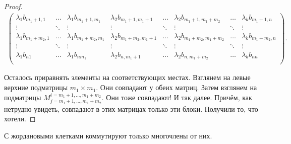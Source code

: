 \begin{proof}
\begin{multline*}
\begin{pmatrix}
            \lambda_1b_{m_1 + 1, 1} & \ldots & \lambda_1b_{m_1 + 1, m_1} & \lambda_2b_{m_1 + 1, m_1 + 1} & \ldots & \lambda_2b_{m_1 + 1, m_1 + m_2} & \ldots & \lambda_kb_{m_1 + 1, n}\\
            \vdots & \ddots & \vdots & \vdots & \ddots & \vdots & \ddots & \vdots\\
            \lambda_1b_{m_1 + m_2, 1} & \ldots & \lambda_1b_{m_1 + m_2, m_1} & \lambda_2b_{m_1 + m_2, m_1 + 1} & \ldots & \lambda_2b_{m_1 + m_2, m_1 + m_2} & \ldots & \lambda_kb_{m_1 + m_2, n}\\
            \vdots & \ddots & \vdots & \vdots & \ddots & \vdots & \ddots & \vdots\\
            \lambda_1b_{n1} & \ldots & \lambda_1b_{nm_1} & \lambda_2b_{n, m_1 + 1} & \ldots & \lambda_2b_{n, m_1 + m_2} & \ldots & \lambda_kb_{nn}\\
        \end{pmatrix}.
    \end{multline*}

    Осталось приравнять элементы на соответствующих местах. Взглянем на левые верхние подматрицы $m_1 \times m_1$. Они совпадают у обеих матриц. Затем взглянем на подматрицы $M^{i = m_1 + 1, \ldots, m_1 + m_2}_{j = m_1 + 1, \ldots, m_1 + m_2}$. Они тоже совпадают! И так далее. Причём, как нетрудно увидеть, совпадают в этих матрицах только эти блоки. Получили то, что хотели.
\end{proof}

\begin{lemma}
    С жордановыми клетками коммутируют только многочлены от них\footnotemark.
\end{lemma}


